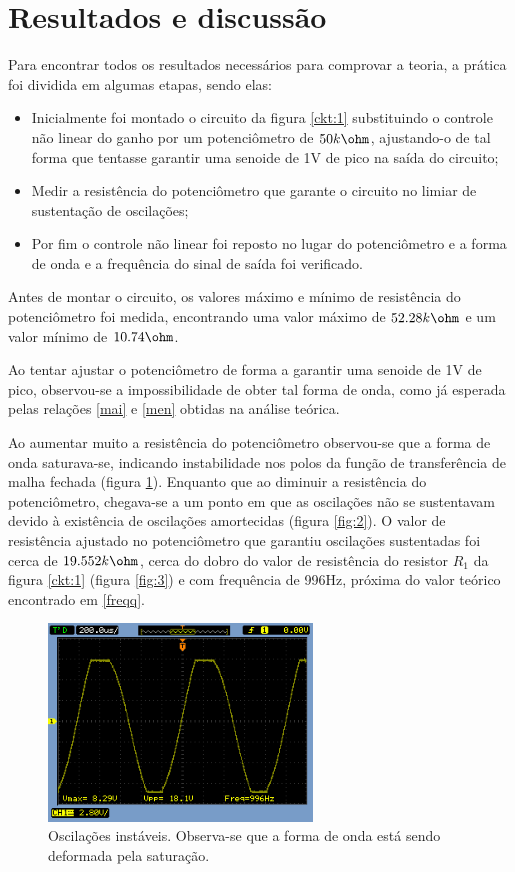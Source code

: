 \section{Resultados e discussão}

Para encontrar todos os resultados necessários para comprovar a teoria, a prática foi dividida em algumas etapas, sendo elas:


\begin{itemize}

    \item Inicialmente foi montado o circuito da figura \ref{ckt:1} substituindo o controle não linear do ganho por um potenciômetro de $50k\ohm$, ajustando-o de tal forma que tentasse garantir uma senoide de 1V de pico na saída do circuito;
    
    \item Medir a resistência do potenciômetro que garante o circuito no limiar de sustentação de oscilações;
    
    \item Por fim o controle não linear foi reposto no lugar do potenciômetro e a forma de onda e a frequência do sinal de saída foi verificado.  
\end{itemize}

Antes de montar o circuito, os valores máximo e mínimo de resistência do potenciômetro foi medida, encontrando uma valor máximo de $52.28k\ohm$ e um valor mínimo de $10.74\ohm$.

Ao tentar ajustar o potenciômetro de forma a garantir uma senoide de 1V de pico, observou-se a impossibilidade de obter tal forma de onda, como já esperada pelas relações \ref{mai} e \ref{men} obtidas na análise teórica.

Ao aumentar muito a resistência do potenciômetro observou-se que a forma de onda saturava-se, indicando instabilidade nos polos da função de transferência de malha fechada (figura \ref{fig:1}). Enquanto que ao diminuir a resistência do potenciômetro, chegava-se a um ponto em que as oscilações não se sustentavam devido à existência de oscilações amortecidas (figura \ref{fig:2}). O valor de resistência ajustado no potenciômetro que garantiu oscilações sustentadas foi cerca de $19.552k\ohm$, cerca do dobro do valor de resistência do resistor $R_1$ da figura \ref{ckt:1} (figura \ref{fig:3}) e com frequência de 996Hz, próxima do valor teórico encontrado em \ref{freqq}. 

\begin{figure}[H] 
\centering
\includegraphics[width=7cm]{images/sat.png}
\caption{Oscilações instáveis. Observa-se que a forma de onda está sendo deformada pela saturação.}
\label{fig:1} 
\end{figure}

